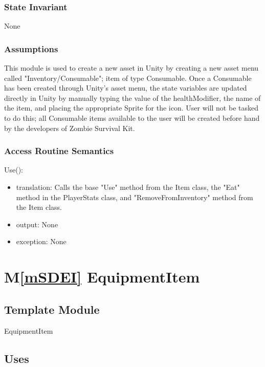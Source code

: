 \documentclass[12pt]{article}
\newcommand{\mref}[1]{M\ref{#1}}
\begin{document}
\subsubsection* {State Invariant}

None

\subsubsection* {Assumptions}

This module is used to create a new asset in Unity by creating a new asset menu called "Inventory/Consumable"; item of type Consumable. Once a Consumable has been created through Unity's asset menu, the state variables are updated directly in Unity by manually typing the value of the healthModifier, the name of the item, and placing the appropriate Sprite for the icon. User will not be tasked to do this; all Consumable items available to the user will be created before hand by the developers of Zombie Survival Kit.

\subsubsection* {Access Routine Semantics}

\noindent Use():
\begin{itemize}
\item translation: Calls the base "Use" method from the Item class, the "Eat" method in the PlayerStats class, and "RemoveFromInventory" method from the Item class.
\item output: None
\item exception: None
\end{itemize}

\newpage

\section* {\mref{mSDEI} EquipmentItem}

\subsection*{Template Module}

EquipmentItem

\subsection* {Uses}
\end{document}
